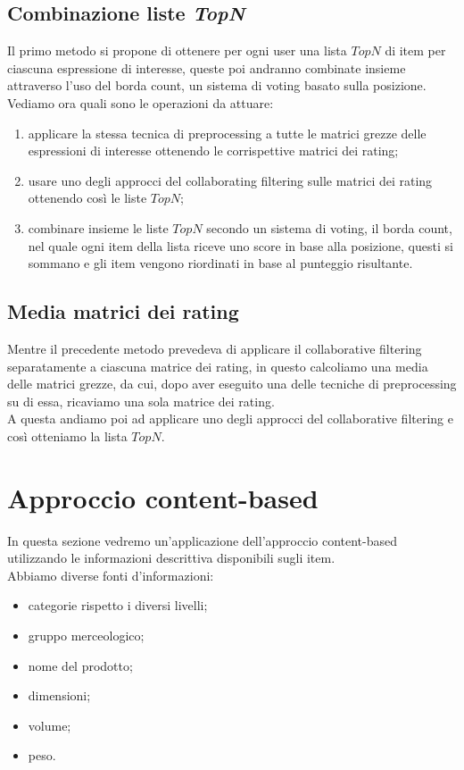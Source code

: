 \subsection{Combinazione liste \textit{TopN}}
Il primo metodo si propone di ottenere per ogni user una lista $TopN$ di item per ciascuna espressione di interesse, queste poi andranno combinate insieme attraverso l'uso del borda count, un sistema di voting basato sulla posizione.
Vediamo ora quali sono le operazioni da attuare:
\begin{enumerate}
    \item applicare la stessa tecnica di preprocessing a tutte le matrici grezze delle espressioni di interesse ottenendo le corrispettive matrici dei rating;
    \item usare uno degli approcci del collaborating filtering sulle matrici dei rating ottenendo così le liste $TopN$;
    \item combinare insieme le liste $TopN$ secondo un sistema di voting, il borda count, nel quale ogni item della lista riceve uno score in base alla posizione, questi si sommano e gli item vengono riordinati in base al punteggio risultante.
\end{enumerate}

\subsection{Media matrici dei rating}
Mentre il precedente metodo prevedeva di applicare il collaborative filtering separatamente a ciascuna matrice dei rating, in questo calcoliamo una media delle matrici grezze, da cui, dopo aver eseguito una delle tecniche di preprocessing su di essa, ricaviamo una sola matrice dei rating.\\
A questa andiamo poi ad applicare uno degli approcci del collaborative filtering e così otteniamo la lista $TopN$.

\section{Approccio content-based}
In questa sezione vedremo un'applicazione dell'approccio content-based utilizzando le informazioni descrittiva disponibili sugli item.\\
Abbiamo diverse fonti d'informazioni:
\begin{itemize}
    \item categorie rispetto i diversi livelli;
    \item gruppo merceologico;
    \item nome del prodotto;
    \item dimensioni;
    \item volume;
    \item peso.
\end{itemize}

